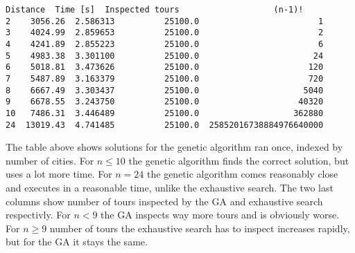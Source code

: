 \documentclass[11pt]{article}
\makeatletter
\newcommand{\boxspacing}{\kern\kvtcb@left@rule\kern\kvtcb@boxsep}
\newcommand{\prompt}[4]{
        \ttfamily\llap{{\color{#2}[#3]:\hspace{3pt}#4}}\vspace{-\baselineskip}
    }
\makeatother
\begin{document}
            \begin{tcolorbox}[breakable, size=fbox, boxrule=.5pt, pad at break*=1mm, opacityfill=0]
\prompt{Out}{outcolor}{12}{\boxspacing}
\begin{Verbatim}[commandchars=\\\{\}]
    Distance  Time [s]  Inspected tours                   (n-1)!
2    3056.26  2.586313          25100.0                        1
3    4024.99  2.859653          25100.0                        2
4    4241.89  2.855223          25100.0                        6
5    4983.38  3.301100          25100.0                       24
6    5018.81  3.473626          25100.0                      120
7    5487.89  3.163379          25100.0                      720
8    6667.49  3.303437          25100.0                     5040
9    6678.55  3.243750          25100.0                    40320
10   7486.31  3.446489          25100.0                   362880
24  13019.43  4.741485          25100.0  25852016738884976640000
\end{Verbatim}
\end{tcolorbox}
        
    The table above shows solutions for the genetic algorithm ran once,
indexed by number of cities. For \(n \leq 10\) the genetic algorithm
finds the correct solution, but uses a lot more time. For \(n=24\) the
genetic algorithm comes reasonably close and executes in a reasonable
time, unlike the exhaustive search. The two last columns show number of
tours inspected by the GA and exhaustive search respectivly. For
\(n < 9\) the GA inspects way more tours and is obviously worse. For
\(n \geq 9\) number of tours the exhaustive search has to inspect
increases rapidly, but for the GA it stays the same.


    
    
    
\end{document}
